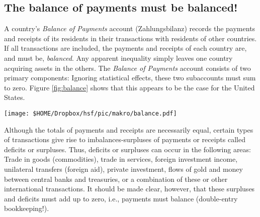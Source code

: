 \subsection{The balance of payments must be balanced!}
A country's \textit{Balance of Payments} account (Zahlungsbilanz) records the payments and receipts of its residents in their transactions with residents of other countries. 
If all transactions are included, the payments and receipts of each country are, and must be, \textit{balanced}. Any apparent inequality simply leaves one country acquiring assets in the others. 
The \textit{Balance of Payments} account consists of two primary components:
Ignoring statistical effects, these two subaccounts must sum to zero. Figure \ref{fig:balance} shows that this appears to be the case for the United States. 

\begin{center}
	\texttt{[image: \$HOME/Dropbox/hsf/pic/makro/balance.pdf]}
	\label{fig:balance}\bigskip
\end{center}

\pbn
Although the totals of payments and receipts are necessarily equal, certain types of transactions give rise to imbalances-surpluses of payments or receipts called deficits or surpluses. Thus, deficits or surpluses can occur in the following areas: Trade in goods (commodities), trade in services, foreign investment income, unilateral transfers (foreign aid), private investment, flows of gold and money between central banks and treasuries, or a combination of these or other international transactions. It should be made clear, however, that these surpluses and deficits must add up to zero, i.e., payments must balance (double-entry bookkeeping!).

